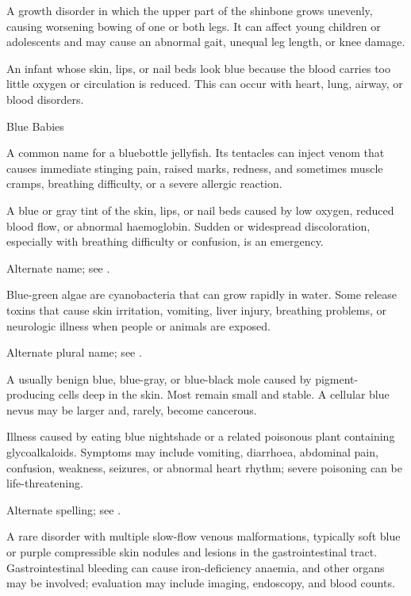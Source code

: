  A growth disorder in which the upper part of the shinbone grows unevenly, causing worsening bowing of one or both legs. It can affect young children or adolescents and may cause an abnormal gait, unequal leg length, or knee damage.

 An infant whose skin, lips, or nail beds look blue
because the blood carries too little oxygen or circulation is reduced. This
can occur with heart, lung, airway, or blood disorders.

\synonyms
Blue Babies

 A common name for a bluebottle jellyfish. Its tentacles can inject venom that causes immediate stinging pain, raised marks, redness, and sometimes muscle cramps, breathing difficulty, or a severe allergic reaction.

 A blue or gray tint of the skin, lips, or nail beds caused by low oxygen, reduced blood flow, or abnormal haemoglobin. Sudden or widespread discoloration, especially with breathing difficulty or confusion, is an emergency.

 Alternate name; see .

 Blue-green algae are cyanobacteria that can grow rapidly in water. Some release toxins that cause skin irritation, vomiting, liver injury, breathing problems, or neurologic illness when people or animals are exposed.

 Alternate plural name; see .

 A usually benign blue, blue-gray, or blue-black mole
caused by pigment-producing cells deep in the skin. Most remain small and
stable. A cellular blue nevus may be larger and, rarely, become cancerous.

 Illness caused by eating blue nightshade or a related poisonous plant containing glycoalkaloids. Symptoms may include vomiting, diarrhoea, abdominal pain, confusion, weakness, seizures, or abnormal heart rhythm; severe poisoning can be life-threatening.

 Alternate spelling; see .

 A rare disorder with multiple slow-flow venous malformations, typically soft blue or purple compressible skin nodules and lesions in the gastrointestinal tract. Gastrointestinal bleeding can cause iron-deficiency anaemia, and other organs may be involved; evaluation may include imaging, endoscopy, and blood counts.

